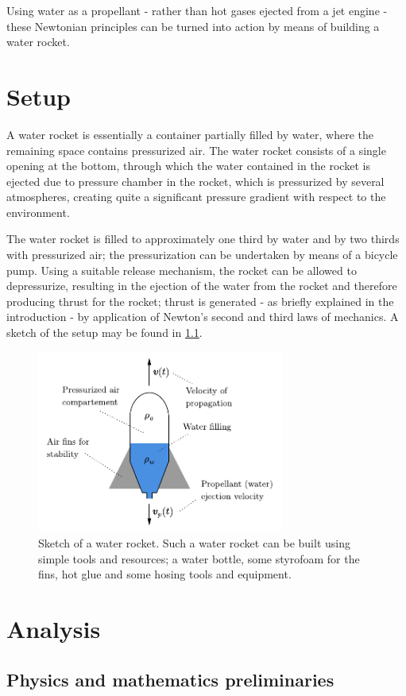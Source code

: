 \documentclass[a4paper,11pt]{report}
\begin{document}
Using water as a propellant - rather than hot gases ejected from a jet engine - these Newtonian principles can be turned into action by means of building a water rocket.

\chapter{Setup}
A water rocket is essentially a container partially filled by water, where the remaining space contains pressurized air. The water rocket consists of a single opening at the bottom, through which the water contained in the rocket is ejected due to pressure chamber in the rocket, which is pressurized by several atmospheres, creating quite a significant pressure gradient with respect to the environment.

The water rocket is filled to approximately one third by water and by two thirds with pressurized air; the pressurization can be undertaken by means of a bicycle pump. Using a suitable release mechanism, the rocket can be allowed to depressurize, resulting in the ejection of the water from the rocket and therefore producing thrust for the rocket; thrust is generated - as briefly explained in the introduction - by application of Newton's second and third laws of mechanics. A sketch of the setup may be found in \cref{fig:setup}.
\begin{figure}[h!]
\centering
\includegraphics[height=6cm]{figures/setup.pdf}
\caption{Sketch of a water rocket. Such a water rocket can be built using simple tools and resources; a water bottle, some styrofoam for the fins, hot glue and some hosing tools and equipment.}
\label{fig:setup}
\end{figure}

\chapter{Analysis}
\section{Physics and mathematics preliminaries}
\end{document}

